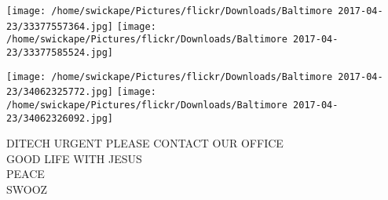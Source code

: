 \documentclass[10pt,letterpaper]{article}
\begin{document}
\texttt{[image: /home/swickape/Pictures/flickr/Downloads/Baltimore 2017-04-23/33377557364.jpg]}
\texttt{[image: /home/swickape/Pictures/flickr/Downloads/Baltimore 2017-04-23/33377585524.jpg]}

\texttt{[image: /home/swickape/Pictures/flickr/Downloads/Baltimore 2017-04-23/34062325772.jpg]}
\texttt{[image: /home/swickape/Pictures/flickr/Downloads/Baltimore 2017-04-23/34062326092.jpg]}

DITECH URGENT PLEASE CONTACT OUR OFFICE\\
GOOD LIFE WITH JESUS\\
PEACE\\
SWOOZ\\
\pagebreak
\end{document}
